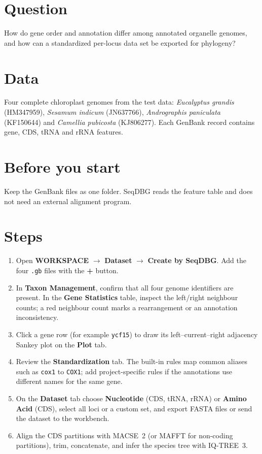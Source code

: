 \documentclass[11pt]{report}
\begin{document}
\section{Question}
How do gene order and annotation differ among annotated organelle genomes,
and how can a standardized per-locus data set be exported for phylogeny?

\section{Data}
Four complete chloroplast genomes from the test data:
\textit{Eucalyptus grandis} (HM347959), \textit{Sesamum indicum} (JN637766),
\textit{Andrographis paniculata} (KF150644) and \textit{Camellia pubicosta}
(KJ806277). Each GenBank record contains gene, CDS, tRNA and rRNA features.

\section{Before you start}
Keep the GenBank files as one folder. SeqDBG reads the feature table and does
not need an external alignment program.

\section{Steps}
\begin{enumerate}
  \item Open \textbf{WORKSPACE} $\rightarrow$ \textbf{Dataset} $\rightarrow$
  \textbf{Create by SeqDBG}. Add the four \texttt{.gb} files with the
  \textbf{+} button.
  \item In \textbf{Taxon Management}, confirm that all four genome identifiers
  are present. In the \textbf{Gene Statistics} table, inspect the left/right
  neighbour counts; a red neighbour count marks a rearrangement or an
  annotation inconsistency.
  \item Click a gene row (for example \texttt{ycf15}) to draw its
  left--current--right adjacency Sankey plot on the \textbf{Plot} tab.
  \item Review the \textbf{Standardization} tab. The built-in rules map common
  aliases such as \texttt{cox1} to \texttt{COX1}; add project-specific rules
  if the annotations use different names for the same gene.
  \item On the \textbf{Dataset} tab choose \textbf{Nucleotide} (CDS, tRNA,
  rRNA) or \textbf{Amino Acid} (CDS), select all loci or a custom set, and
  export FASTA files or send the dataset to the workbench.
  \item Align the CDS partitions with MACSE~2 (or MAFFT for non-coding
  partitions), trim, concatenate, and infer the species tree with IQ-TREE~3.
\end{enumerate}
\end{document}
